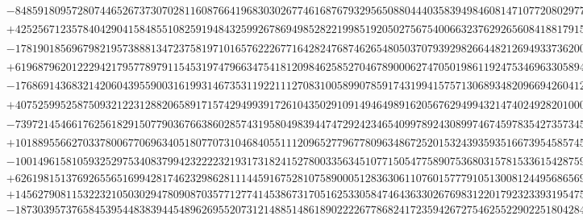 \documentclass[preprint,12pt,authoryear]{elsarticle}
\begin{document}
{\begin{align*}
  &-848591809572807446526737307028116087664196830302677461687679329565088044403583949846081471077208029772845733783978556x_5^{10}\\
  &+425256712357840429041584855108259194843259926786949852822199851920502756754006632376292656084188179152265324768387541x_5^9\\
  &-178190185696798219573888134723758197101657622267716428247687462654805037079392982664482126949337362000059358903070826x_5^8\\
  &+61968796201222942179577897911545319747966347541812098462585270467890006274705019861192475346963305894981804268851065x_5^7\\
  &-17686914368321420604395590031619931467353119221112708310058990785917431994157571306893482096694260412715975874006756x_5^6\\
  &+4075259952587509321223128820658917157429499391726104350291091494649891620567629499432147402492820100061680066097185x_5^5\\
  &-739721454661762561829150779036766386028574319580498394474729242346540997892430899746745978354273573458080278629282x_5^4\\
  &+101889556627033780067706963405180770731046840551112096527796778096348672520153243935935166739545857450254458665078x_5^3\\
  &-10014961581059325297534083799423222232193173182415278003356345107715054775890753680315781533615428759531894840428x_5^2\\
  &+626198151376926556516994281746232986281114459167528107589000512836306110760157779105130081244956865692258077872x_5\\
  &+14562790811532232105030294780908703577127741453867317051625330584746436330267698312201792323393195475584x_4\\
  &-18730395737658453954483839445489626955207312148851486189022226778682417235942672754625522902251804284010201836,
\end{align*}
}
\end{document}
